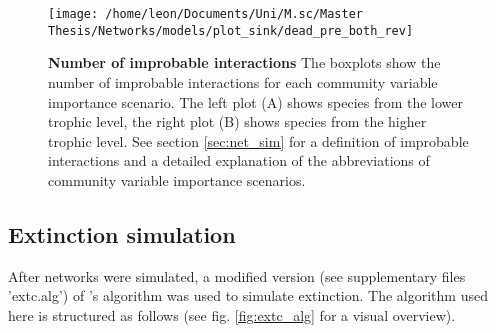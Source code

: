 \documentclass[12pt,a4paper]{article}
\begin{document}
\begin{figure}[H]
	 \texttt{[image: /home/leon/Documents/Uni/M.sc/Master Thesis/Networks/models/plot\_sink/dead\_pre\_both\_rev]}
	 \caption[Number of improbable interactions]{\textbf{Number of improbable interactions} The boxplots show the number of improbable interactions for each community variable importance scenario.
	 The left plot (A) shows species from the lower trophic level, the right plot (B) shows species from the higher trophic level. See section \ref{sec:net_sim} for a definition of improbable interactions and a detailed explanation of the abbreviations of community variable importance scenarios.}
	 \label{fig:dead_int}
\end{figure}


	\subsection{Extinction simulation} \label{sec:extc_sim}
	After networks were simulated, a modified version (see supplementary files 'extc.alg') of \citeauthor{Vizentin-Bugoni2019}'s algorithm was used to simulate extinction. The algorithm used here is structured as follows (see fig. \ref{fig:extc_alg} for a visual overview). 
\end{document}
